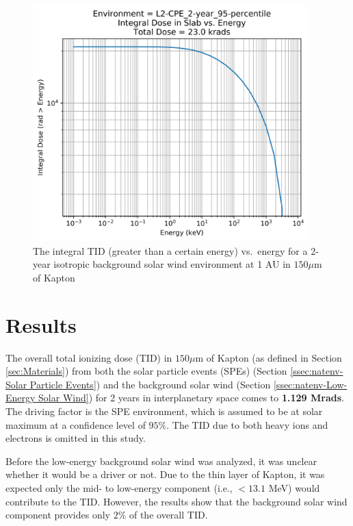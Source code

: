 \documentclass{hitec}
\begin{document}
\begin{figure}[htbp!]
	\centering
	\includegraphics[width=0.95\textwidth]{../L2-CPE_2-year_95-percentile_Integral_Dose_vs_Energy.png}
	\caption{The integral TID (greater than a certain energy) vs.\ energy for a 2-year isotropic background solar wind environment at 1 AU in $150 \mu$m of Kapton}\label{fig:L2-CPE_2-year_95-percentile_Integral_Dose_vs_Energy}
\end{figure}

\clearpage %

\section{Results}

The overall total ionizing dose (TID) in $150\mu$m of Kapton (as defined in Section \ref{sec:Materials}) from both the solar particle events (SPEs) (Section \ref{ssec:natenv-Solar Particle Events}) and the background solar wind (Section \ref{ssec:natenv-Low-Energy Solar Wind}) for 2 years in interplanetary space comes to \textbf{1.129 Mrads}. The driving factor is the SPE environment, which is assumed to be at solar maximum at a confidence level of $95\%$. The TID due to both heavy ions and electrons is omitted in this study.

Before the low-energy background solar wind was analyzed, it was unclear whether it would be a driver or not. Due to the thin layer of Kapton, it was expected only the mid- to low-energy component (i.e., $< 13.1$ MeV) would contribute to the TID. However, the results show that the background solar wind component provides only $2\%$ of the overall TID.
\end{document}
